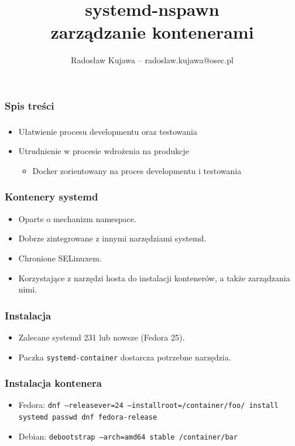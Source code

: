 \documentclass[dvipsnames,table]{beamer}
\title{systemd-nspawn \\ zarządzanie kontenerami}
\author{Radosław Kujawa -- radoslaw.kujawa@osec.pl}
\institute{OSEC}
\begin{document}
\begin{frame}
	\titlepage
\end{frame}

\begin{frame}[allowframebreaks]
	\frametitle{Spis treści}
	{
		\hypersetup{colorlinks=true,linkcolor=black,urlcolor=OSEC-red}
		\tableofcontents
	}
\end{frame}


\begin{frame}
\frametitle{}
\begin{itemize}
	\item Ułatwienie procesu developmentu oraz testowania 
	\item Utrudnienie w procesie wdrożenia na produkcje
	\begin{itemize}
		\item Docker zorientowany na proces developmentu i testowania
	\end{itemize}
\end{itemize}
\end{frame}

\begin{frame}
\frametitle{Kontenery systemd}
\begin{itemize}
	\item Oparte o mechanizm namespace.
	\item Dobrze zintegrowane z innymi narzędziami systemd.
	\item Chronione SELinuxem.
	\item Korzystające z narzędzi hosta do instalacji kontenerów, a także zarządzania nimi.
\end{itemize}
\end{frame}

\begin{frame}
\frametitle{Instalacja}
\begin{itemize}
	\item Zalecane systemd 231 lub nowsze (Fedora 25).
	\item Paczka {\tt systemd-container} dostarcza potrzebne narzędzia.
\end{itemize}
\end{frame}

\begin{frame}
\frametitle{Instalacja kontenera}
\begin{itemize}
	\item Fedora: {\tt dnf --releasever=24 --installroot=/container/foo/ install systemd passwd dnf fedora-release}
	\item Debian: {\tt debootstrap --arch=amd64 stable /container/bar}
\end{itemize}
\end{frame}
\end{document}
